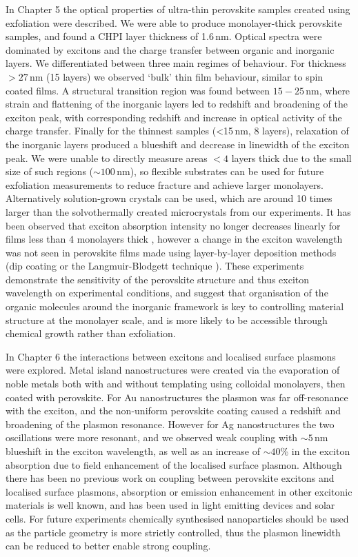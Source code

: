 In Chapter 5 the optical properties of ultra-thin perovskite samples created using exfoliation were described. We were able to produce monolayer-thick perovskite samples, and found a CHPI layer thickness of 1.6\,nm. Optical spectra were dominated by excitons and the charge transfer between organic and inorganic layers. We differentiated between three main regimes of behaviour. For thickness $>27$\,nm (15 layers) we observed `bulk' thin film behaviour, similar to spin coated films. A structural transition region was found between $15-25$\,nm, where strain and flattening of the inorganic layers led to redshift and broadening of the exciton peak, with corresponding redshift and increase in optical activity of the charge transfer. Finally for the thinnest samples (<15\,nm, 8 layers), relaxation of the inorganic layers produced a blueshift and decrease in linewidth of the exciton peak. %
We were unable to directly measure areas $<4$ layers thick due to the small size of such regions ($\sim100$\,nm), so flexible substrates can be used for future exfoliation measurements to reduce fracture and achieve larger monolayers. Alternatively solution-grown crystals can be used, which are around 10 times larger than the solvothermally created microcrystals from our experiments. It has been observed that exciton absorption intensity no longer decreases linearly for films less than 4 monolayers thick \cite{Matsui2002}, however a change in the exciton wavelength was not seen in perovskite films made using layer-by-layer deposition methods (dip coating \cite{Matsui2002} or the Langmuir-Blodgett technique \cite{Era2000}). These experiments demonstrate the sensitivity of the perovskite structure and thus exciton wavelength on experimental conditions, and suggest that organisation of the organic molecules around the inorganic framework is key to controlling material structure at the monolayer scale, and is more likely to be accessible through chemical growth rather than exfoliation. %

In Chapter 6 the interactions between excitons and localised surface plasmons were explored. Metal island nanostructures were created via the evaporation of noble metals both with and without templating using colloidal monolayers, then coated with perovskite. For Au nanostructures the plasmon was far off-resonance with the exciton, and the non-uniform perovskite coating caused a redshift and broadening of the plasmon resonance. However for Ag nanostructures the two oscillations were more resonant, and we observed weak coupling with $\sim 5$\,nm blueshift in the exciton wavelength, as well as an increase of $\sim 40$\% in the exciton absorption due to field enhancement of the localised surface plasmon. %
Although there has been no previous work on coupling between perovskite excitons and localised surface plasmons, absorption or emission enhancement in other excitonic materials is well known, and has been used in light emitting devices and solar cells. For future experiments chemically synthesised nanoparticles should be used as the particle geometry is more strictly controlled, thus the plasmon linewidth can be reduced to better enable strong coupling. %

